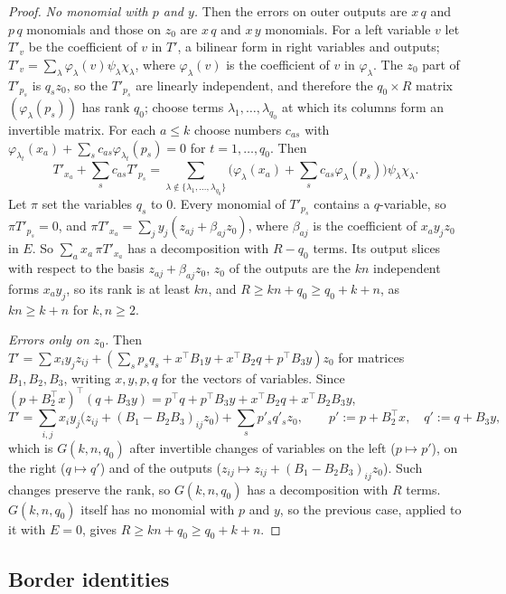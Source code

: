 \documentclass[11pt]{article}
\theoremstyle{definition}
\theoremstyle{remark}
\begin{document}
\begin{proof}
\emph{No monomial with $p$ and $y$.} Then the errors on outer outputs are $x\,q$ and $p\,q$ monomials and those on $z_0$ are $x\,q$ and $x\,y$ monomials. For a left variable $v$ let $T'_v$ be the coefficient of $v$ in $T'$, a bilinear form in right variables and outputs; $T'_v=\sum_\lambda\varphi_\lambda(v)\psi_\lambda\chi_\lambda$, where $\varphi_\lambda(v)$ is the coefficient of $v$ in $\varphi_\lambda$. The $z_0$ part of $T'_{p_s}$ is $q_sz_0$, so the $T'_{p_s}$ are linearly independent, and therefore the $q_0\times R$ matrix $(\varphi_\lambda(p_s))$ has rank $q_0$; choose terms $\lambda_1,\dots,\lambda_{q_0}$ at which its columns form an invertible matrix. For each $a\le k$ choose numbers $c_{as}$ with $\varphi_{\lambda_t}(x_a)+\sum_sc_{as}\varphi_{\lambda_t}(p_s)=0$ for $t=1,\dots,q_0$. Then
\[
T'_{x_a}+\sum_sc_{as}T'_{p_s}=\sum_{\lambda\notin\{\lambda_1,\dots,\lambda_{q_0}\}}\Big(\varphi_\lambda(x_a)+\sum_sc_{as}\varphi_\lambda(p_s)\Big)\psi_\lambda\chi_\lambda .
\]
Let $\pi$ set the variables $q_s$ to $0$. Every monomial of $T'_{p_s}$ contains a $q$-variable, so $\pi T'_{p_s}=0$, and $\pi T'_{x_a}=\sum_jy_j(z_{aj}+\beta_{aj}z_0)$, where $\beta_{aj}$ is the coefficient of $x_ay_jz_0$ in $E$. So $\sum_ax_a\,\pi T'_{x_a}$ has a decomposition with $R-q_0$ terms. Its output slices with respect to the basis $z_{aj}+\beta_{aj}z_0$, $z_0$ of the outputs are the $kn$ independent forms $x_ay_j$, so its rank is at least $kn$, and $R\ge kn+q_0\ge q_0+k+n$, as $kn\ge k+n$ for $k,n\ge2$.

\emph{Errors only on $z_0$.} Then $T'=\sum x_iy_jz_{ij}+(\sum_sp_sq_s+x^\top B_1y+x^\top B_2q+p^\top B_3y)z_0$ for matrices $B_1,B_2,B_3$, writing $x,y,p,q$ for the vectors of variables. Since $(p+B_2^\top x)^\top(q+B_3y)=p^\top q+p^\top B_3y+x^\top B_2q+x^\top B_2B_3y$,
\[
T'=\sum_{i,j}x_iy_j\big(z_{ij}+(B_1-B_2B_3)_{ij}z_0\big)+\sum_sp'_sq'_sz_0,\qquad p':=p+B_2^\top x,\quad q':=q+B_3y,
\]
which is $G(k,n,q_0)$ after invertible changes of variables on the left ($p\mapsto p'$), on the right ($q\mapsto q'$) and of the outputs ($z_{ij}\mapsto z_{ij}+(B_1-B_2B_3)_{ij}z_0$). Such changes preserve the rank, so $G(k,n,q_0)$ has a decomposition with $R$ terms. $G(k,n,q_0)$ itself has no monomial with $p$ and $y$, so the previous case, applied to it with $E=0$, gives $R\ge kn+q_0\ge q_0+k+n$.
\end{proof}

\subsection{Border identities}\label{a:sec:border}
\end{document}

